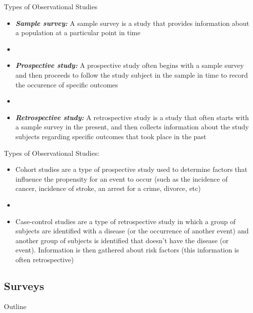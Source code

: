\documentclass[xcolor=dvipsnames]{beamer}
\begin{document}
\begin{frame}{Types of Observational Studies}
	\begin{itemize}
		\item \textbf{\emph{Sample survey:}} A sample survey is a study that provides information about a population at a particular point in time
		\item[]
		\item \textbf{\emph{Prospective study:}} A prospective study often begins with a sample survey and then proceeds to follow the study subject in the sample in time to record the occurence of specific outcomes
		\item[]
		\item \textbf{\emph{Retrospective study:}} A retrospective study is a study that often starts with a sample survey in the present, and then collects information about the study subjects regarding specific outcomes that took place in the past
	\end{itemize}
\end{frame}

\begin{frame}{Types of Observational Studies:}
	\begin{itemize}
		\item Cohort studies are a type of prospective study used to determine factors that influence the propensity for an event to occur (such as the incidence of cancer, incidence of stroke, an arrest for a crime, divorce, etc)
		\item[]
		\item Case-control studies are a type of retrospective study in which a group of subjects are identified with a disease (or the occurrence of another event) and another group of subjects is identified that doesn't have the disease (or event). Information is then gathered about risk factors (this information is often retrospective)
	\end{itemize}
\end{frame}

\subsection{Surveys}
\begin{frame}{Outline}
\tableofcontents[currentsection,subsectionstyle=show/shaded/hide]
\end{frame}
\end{document}
